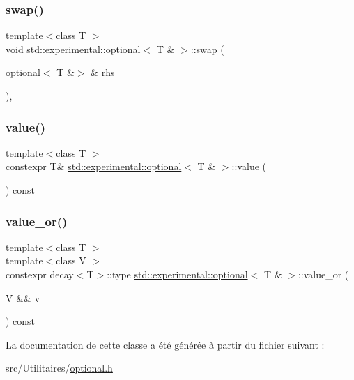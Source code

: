 \subsubsection{\texorpdfstring{swap()}{swap()}}
{\footnotesize\ttfamily template$<$class T $>$ \\
void \hyperlink{classstd_1_1experimental_1_1optional}{std\+::experimental\+::optional}$<$ T \& $>$\+::swap (\begin{DoxyParamCaption}\item[{\hyperlink{classstd_1_1experimental_1_1optional}{optional}$<$ T \&$>$ \&}]{rhs }\end{DoxyParamCaption})\hspace{0.3cm}{\ttfamily [inline]}, {\ttfamily [noexcept]}}

\mbox{\label{classstd_1_1experimental_1_1optional_3_01_t_01_6_01_4_a26bcfd23d34cf8fa4e875182b0509880}} 
\subsubsection{\texorpdfstring{value()}{value()}}
{\footnotesize\ttfamily template$<$class T $>$ \\
constexpr T\& \hyperlink{classstd_1_1experimental_1_1optional}{std\+::experimental\+::optional}$<$ T \& $>$\+::value (\begin{DoxyParamCaption}{ }\end{DoxyParamCaption}) const\hspace{0.3cm}{\ttfamily [inline]}}

\mbox{\label{classstd_1_1experimental_1_1optional_3_01_t_01_6_01_4_a94a0ddc8d79f9118e9271a17858ca632}} 
\subsubsection{\texorpdfstring{value\+\_\+or()}{value\_or()}}
{\footnotesize\ttfamily template$<$class T $>$ \\
template$<$class V $>$ \\
constexpr decay$<$T$>$\+::type \hyperlink{classstd_1_1experimental_1_1optional}{std\+::experimental\+::optional}$<$ T \& $>$\+::value\+\_\+or (\begin{DoxyParamCaption}\item[{V \&\&}]{v }\end{DoxyParamCaption}) const\hspace{0.3cm}{\ttfamily [inline]}}



La documentation de cette classe a été générée à partir du fichier suivant \+:\begin{DoxyCompactItemize}
\item 
src/\+Utilitaires/\hyperlink{optional_8h}{optional.\+h}\end{DoxyCompactItemize}
